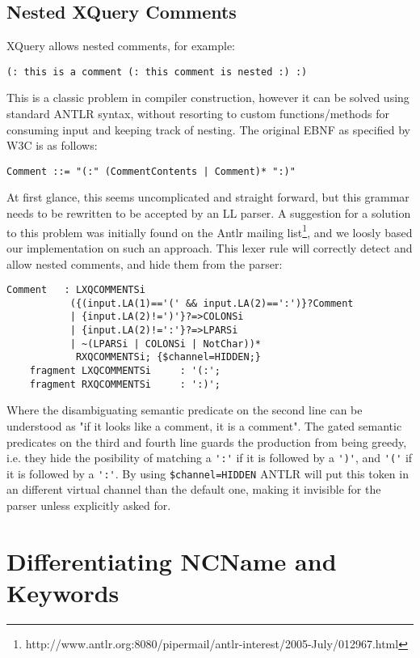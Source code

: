 \subsection{Nested XQuery Comments}
XQuery allows nested comments, for example:
\begin{verbatim}
(: this is a comment (: this comment is nested :) :)
\end{verbatim}
This is a classic problem in compiler construction, however it can be solved using standard ANTLR syntax, without resorting to custom functions/methods for consuming input and keeping track of nesting. The original EBNF as specified by W3C is as follows:
\begin{verbatim}
Comment ::= "(:" (CommentContents | Comment)* ":)"
\end{verbatim}
At first glance, this seems uncomplicated and straight forward, but this grammar needs to be rewritten to be accepted by an LL parser. A suggestion for a solution to this problem was initially found on the Antlr mailing list\footnote{http://www.antlr.org:8080/pipermail/antlr-interest/2005-July/012967.html}, and we loosly based our implementation on such an approach. This lexer rule will correctly detect and allow nested comments, and hide them from the parser:
\begin{verbatim}   
Comment   : LXQCOMMENTSi 
           ({(input.LA(1)=='(' && input.LA(2)==':')}?Comment 
           | {input.LA(2)!=')'}?=>COLONSi
           | {input.LA(2)!=':'}?=>LPARSi
           | ~(LPARSi | COLONSi | NotChar))*
            RXQCOMMENTSi; {$channel=HIDDEN;}
    fragment LXQCOMMENTSi     : '(:';
    fragment RXQCOMMENTSi     : ':)';
\end{verbatim}
Where the disambiguating semantic predicate on the second line can be understood as "if it looks like a comment, it is a comment". The gated semantic predicates on the third and fourth line guards the production from being greedy, i.e. they hide the posibility of matching a \verb!':'! if it is followed by a \verb!')'!, and \verb!'('! if it is followed by a \verb!':'!. By using \verb!$channel=HIDDEN! ANTLR will put this token in an different virtual channel than the default one, making it invisible for the parser unless explicitly asked for. 

\section{Differentiating NCName and Keywords}
\label{sect:rewritegrammar:keywordNCName}

